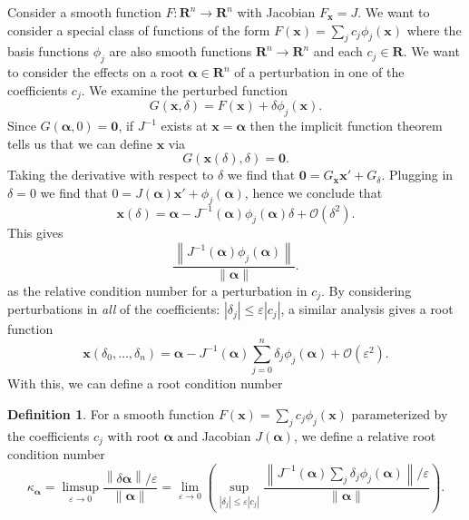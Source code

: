 \documentclass[3p, authoryear, square]{elsarticle}
\theoremstyle{definition}
\newtheorem{definition}{Definition}[section]
\newcommand{\reals}{\mathbf{R}}
\newcommand{\bigO}[1]{\mathcal{O}\left(#1\right)}
\newcommand{\eps}{\varepsilon}
\begin{document}
Consider a smooth function \(F: \reals^n \longrightarrow \reals^n\)
with Jacobian \(F_{\bm{x}} = J\). We want to consider a special class of
functions of the form \(F\left(\bm{x}\right) = \sum_j c_j
\phi_j\left(\bm{x}\right)\) where the basis
functions \(\phi_j\) are also smooth functions
\(\reals^n \longrightarrow \reals^n\)
and each \(c_j \in \reals\). We want to consider the effects on a root
\(\bm{\alpha} \in \reals^n\) of a perturbation in one of the
coefficients \(c_j\). We examine the perturbed function
\begin{equation}
G\left(\bm{x}, \delta\right) = F\left(\bm{x}\right) +
\delta \phi_j\left(\bm{x}\right).
\end{equation}
Since \(G\left(\bm{\alpha}, 0\right) = \bm{0}\), if \(J^{-1}\) exists at
\(\bm{x} = \bm{\alpha}\) then
the implicit function theorem tells us that we can define
\(\bm{x}\) via
\begin{equation}
G\left(\bm{x}\left(\delta\right), \delta\right) = \bm{0}.
\end{equation}
Taking the derivative with respect to \(\delta\) we find that
\(\bm{0} = G_{\bm{x}} \bm{x}' + G_{\delta}\). Plugging in
\(\delta = 0\) we find that \(0 = J\left(\bm{\alpha}\right) \bm{x}' +
\phi_j\left(\bm{\alpha}\right)\), hence we
conclude that
\begin{equation}
\bm{x}\left(\delta\right) = \bm{\alpha} - J^{-1}\left(\bm{\alpha}\right)
  \phi_j\left(\bm{\alpha}\right) \delta + \bigO{\delta^2}.
\end{equation}
This gives
\begin{equation}
\frac{\left \lVert J^{-1}\left(\bm{\alpha}\right)
  \phi_j\left(\bm{\alpha}\right) \right \rVert}{
  \left \lVert \bm{\alpha} \right \rVert}.
\end{equation}
as the relative condition number for a perturbation in \(c_j\).
By considering perturbations in \emph{all} of the coefficients:
\(\left|\delta_j\right| \leq \eps \left|c_j\right|\), a similar analysis
gives a root function
\begin{equation}
\bm{x}\left(\delta_0, \ldots, \delta_n\right) = \bm{\alpha} -
  J^{-1}\left(\bm{\alpha}\right) \sum_{j = 0}^n \delta_j
  \phi_j\left(\bm{\alpha}\right) + \bigO{\eps^2}.
\end{equation}
With this, we can define a root condition number

\begin{definition}\label{defn:abstract-cond-num}
For a smooth function \(F\left(\bm{x}\right) = \sum_j c_j
\phi_j\left(\bm{x}\right)\) parameterized by the coefficients
\(c_j\) with root \(\bm{\alpha}\) and Jacobian
\(J\left(\bm{\alpha}\right)\), we define a relative root condition
number
\begin{equation}
\kappa_{\bm{\alpha}} =
  \limsup_{\eps \to 0} \frac{\left \lVert\delta \bm{\alpha}
  \right \rVert / \eps}{\left \lVert\bm{\alpha}\right \rVert} =
  \lim_{\eps \to 0} \left(\sup_{\left|\delta_j\right| \leq
  \eps \left|c_j\right|} \frac{\left \lVert
  J^{-1}\left(\bm{\alpha}\right) \sum_j \delta_j
  \phi_j\left(\bm{\alpha}\right) \right \rVert / \eps}{
  \left \lVert\bm{\alpha}\right \rVert}\right).
\end{equation}
\end{definition}
\end{document}
